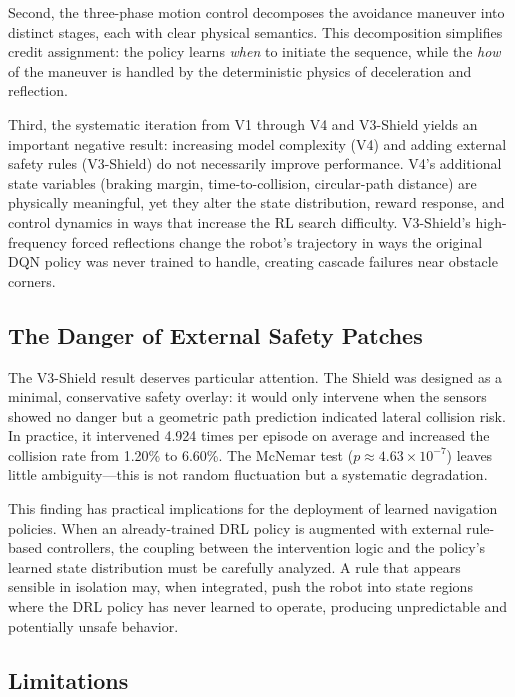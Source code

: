 \documentclass[conference]{IEEEtran}
\begin{document}
Second, the three-phase motion control decomposes the avoidance maneuver into distinct stages, each with clear physical semantics. This decomposition simplifies credit assignment: the policy learns \emph{when} to initiate the sequence, while the \emph{how} of the maneuver is handled by the deterministic physics of deceleration and reflection.

Third, the systematic iteration from V1 through V4 and V3-Shield yields an important negative result: increasing model complexity (V4) and adding external safety rules (V3-Shield) do not necessarily improve performance. V4's additional state variables (braking margin, time-to-collision, circular-path distance) are physically meaningful, yet they alter the state distribution, reward response, and control dynamics in ways that increase the RL search difficulty. V3-Shield's high-frequency forced reflections change the robot's trajectory in ways the original DQN policy was never trained to handle, creating cascade failures near obstacle corners.

\subsection{The Danger of External Safety Patches}

The V3-Shield result deserves particular attention. The Shield was designed as a minimal, conservative safety overlay: it would only intervene when the sensors showed no danger but a geometric path prediction indicated lateral collision risk. In practice, it intervened 4.924 times per episode on average and increased the collision rate from 1.20\% to 6.60\%. The McNemar test ($p \approx 4.63 \times 10^{-7}$) leaves little ambiguity---this is not random fluctuation but a systematic degradation.

This finding has practical implications for the deployment of learned navigation policies. When an already-trained DRL policy is augmented with external rule-based controllers, the coupling between the intervention logic and the policy's learned state distribution must be carefully analyzed. A rule that appears sensible in isolation may, when integrated, push the robot into state regions where the DRL policy has never learned to operate, producing unpredictable and potentially unsafe behavior.

\subsection{Limitations}
\end{document}
